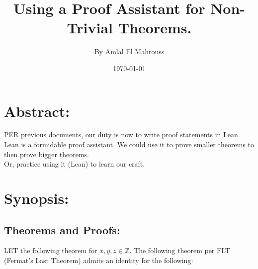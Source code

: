 \documentclass[10pt]{article}
\title{%
	\vspace{-1.5em}%
	\large\textbf{Using a Proof Assistant for Non-Trivial Theorems.}%
}
\author{By Amlal El Mahrouss}
\date{\today}
\theoremstyle{plain}
\theoremstyle{definition}
\theoremstyle{remark}
\begin{document}
	
	\maketitle
	\tableofcontents
	\newpage
	
	\section{Abstract:}
	
	\lettrine[lines=2, lhang=0.1, loversize=0.2]{P}ER previous documents, our duty is now to write proof statements in Lean.\\
	Lean is a formidable proof assistant. We could use it to prove smaller theorems to then prove bigger theorems.\\Or, practice using it (Lean) to learn our craft.

	\section{Synopsis:}

	\subsection{Theorems and Proofs:}

	\lettrine[lines=1, lhang=0.1, loversize=0.2]{L}ET the following theorem for $x, y, z \in \mathbb{Z}$. The following theorem per FLT (Fermat's Last Theorem) admits an identity for the following:
	
\end{document}
